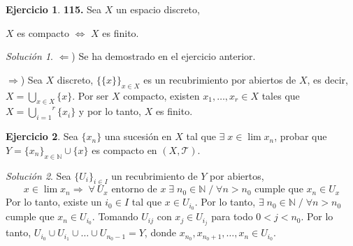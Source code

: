 \documentclass[12pt,twoside]{report}
\newcommand\mc[1]{\mathcal{#1}}
\theoremstyle{azul}
\theoremstyle{azul2}
\theoremstyle{plain}
\theoremstyle{definition}
\newtheorem*{ejern}{Ejercicio}
\theoremstyle{remark}
\newtheorem*{sol}{Solución}
\begin{document}
\; \vspace{-5mm}
\begin{ejern} \textbf{115.} Sea $X$ un espacio discreto,
\vspace{-5mm} \begin{center}
    $X$ es compacto $\Leftrightarrow$ $X$ es finito.
\end{center}
\end{ejern}
\begin{sol}\; 

$\Leftarrow$) Se ha demostrado en el ejercicio anterior. 

$\Rightarrow$) Sea $X$ discreto, $\big\{\{x\}\big\}_{x \in X}$ es un recubrimiento por abiertos de $X$, es decir,\\ $X=\underset{x \in X}{\bigcup}\{x\}$. Por ser $X$ compacto, existen $x_1, \ldots, x_r \in X$ tales que $X=\overset{r}{\underset{i=1}{\bigcup}} \{x_i\}$ y por lo tanto, $X$ es finito.
\end{sol}
\; \vspace{-5mm}
\begin{ejern} Sea $\{x_n\}$ una sucesión en $X$ tal que  $\exists \; x \in \lim x_n$, probar que $Y=\{x_n\}_{x \in \mathbb{N}} \cup \{x\}$ es compacto en $(X, \mc{T})$.
\end{ejern}
\begin{sol}
Sea $\{U_i\}_{i \in I}$ un recubrimiento de $Y$ por abiertos, 
$$x \in \lim x_n \Rightarrow \; \forall \: U_x \text{ entorno de } x \; \exists \; n_0 \in \mathbb{N} \; / \; \forall n > n_0 \text{ cumple que } x_n \in U_x $$
Por lo tanto, existe un $i_0 \in I$ tal que $x \in U_{i_0}$. Por lo tanto, $\exists \; n_0 \in \mathbb{N} \; / \; \forall n > n_0$  cumple que  $x_n \in U_{i_0}$. Tomando $U_{ij}$ con $x_j \in U_{i_j}$ para todo $0 < j < n_0$. Por lo tanto, $U_{i_0} \cup U_{i_1} \cup \ldots \cup U_{n_0 -1} = Y$, donde $x_{n_0}, x_{n_0 +1}, \ldots, x_n \in U_{i_0}$.
\end{sol}
\end{document}
